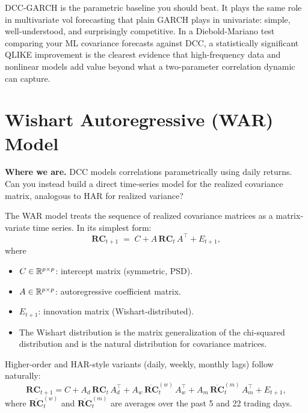 \begin{projectconnection}
DCC-GARCH is the parametric baseline you should beat. It plays the same role
in multivariate vol forecasting that plain GARCH plays in univariate: simple,
well-understood, and surprisingly competitive. In a Diebold-Mariano test
comparing your ML covariance forecasts against DCC, a statistically significant
QLIKE improvement is the clearest evidence that high-frequency data and
nonlinear models add value beyond what a two-parameter correlation dynamic
can capture.
\end{projectconnection}


\section{Wishart Autoregressive (WAR) Model}\label{sec:multivariate:war}

\textbf{Where we are.}  DCC models correlations parametrically using daily
returns. Can you instead build a direct time-series model for the realized
covariance matrix, analogous to HAR for realized variance?

\begin{keyidea}
The WAR model treats the sequence of realized covariance matrices as a
matrix-variate time series. In its simplest form:
\begin{equation}\label{eq:war}
  \mathbf{RC}_{t+1} \;=\; C + A\,\mathbf{RC}_t\,A^\top + E_{t+1},
\end{equation}
where
\begin{itemize}[nosep]
  \item $C \in \mathbb{R}^{p \times p}$: intercept matrix (symmetric, PSD).
  \item $A \in \mathbb{R}^{p \times p}$: autoregressive coefficient matrix.
  \item $E_{t+1}$: innovation matrix (Wishart-distributed).
  \item The Wishart distribution is the matrix generalization of the
        chi-squared distribution and is the natural distribution for covariance
        matrices.
\end{itemize}
Higher-order and HAR-style variants (daily, weekly, monthly lags) follow
naturally:
\[
  \mathbf{RC}_{t+1} = C
  + A_d\,\mathbf{RC}_t\, A_d^\top
  + A_w\,\overline{\mathbf{RC}}_t^{(w)}\, A_w^\top
  + A_m\,\overline{\mathbf{RC}}_t^{(m)}\, A_m^\top
  + E_{t+1},
\]
where $\overline{\mathbf{RC}}_t^{(w)}$ and $\overline{\mathbf{RC}}_t^{(m)}$
are averages over the past 5 and 22 trading days.
\end{keyidea}

